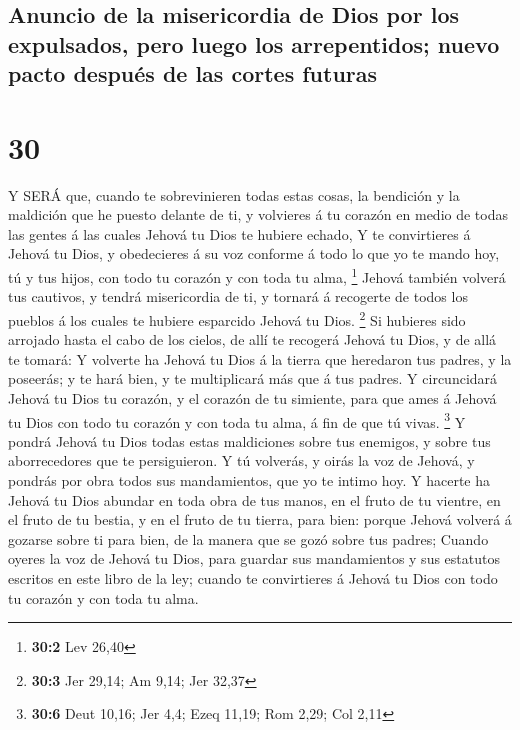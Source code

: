 \hypertarget{anuncio-de-la-misericordia-de-dios-por-los-expulsados-pero-luego-los-arrepentidos-nuevo-pacto-despuuxe9s-de-las-cortes-futuras}{%
\subsection{Anuncio de la misericordia de Dios por los expulsados, pero
luego los arrepentidos; nuevo pacto después de las cortes
futuras}\label{anuncio-de-la-misericordia-de-dios-por-los-expulsados-pero-luego-los-arrepentidos-nuevo-pacto-despuuxe9s-de-las-cortes-futuras}}

\hypertarget{section-29}{%
\section{30}\label{section-29}}

 Y SERÁ que, cuando te sobrevinieren todas estas cosas, la
bendición y la maldición que he puesto delante de ti, y volvieres á tu
corazón en medio de todas las gentes á las cuales Jehová tu Dios te
hubiere echado,  Y te convirtieres á Jehová tu Dios, y
obedecieres á su voz conforme á todo lo que yo te mando hoy, tú y tus
hijos, con todo tu corazón y con toda tu alma, \footnote{\textbf{30:2}
  Lev 26,40}  Jehová también volverá tus cautivos, y tendrá
misericordia de ti, y tornará á recogerte de todos los pueblos á los
cuales te hubiere esparcido Jehová tu Dios. \footnote{\textbf{30:3} Jer
  29,14; Am 9,14; Jer 32,37}  Si hubieres sido arrojado
hasta el cabo de los cielos, de allí te recogerá Jehová tu Dios, y de
allá te tomará:  Y volverte ha Jehová tu Dios á la tierra
que heredaron tus padres, y la poseerás; y te hará bien, y te
multiplicará más que á tus padres.  Y circuncidará Jehová tu
Dios tu corazón, y el corazón de tu simiente, para que ames á Jehová tu
Dios con todo tu corazón y con toda tu alma, á fin de que tú vivas.
\footnote{\textbf{30:6} Deut 10,16; Jer 4,4; Ezeq 11,19; Rom 2,29; Col
  2,11}  Y pondrá Jehová tu Dios todas estas maldiciones
sobre tus enemigos, y sobre tus aborrecedores que te persiguieron.
 Y tú volverás, y oirás la voz de Jehová, y pondrás por obra
todos sus mandamientos, que yo te intimo hoy.  Y hacerte ha
Jehová tu Dios abundar en toda obra de tus manos, en el fruto de tu
vientre, en el fruto de tu bestia, y en el fruto de tu tierra, para
bien: porque Jehová volverá á gozarse sobre ti para bien, de la manera
que se gozó sobre tus padres;  Cuando oyeres la voz de
Jehová tu Dios, para guardar sus mandamientos y sus estatutos escritos
en este libro de la ley; cuando te convirtieres á Jehová tu Dios con
todo tu corazón y con toda tu alma.

